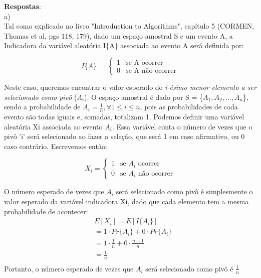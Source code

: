 \documentclass{article}
\begin{document}
\textbf{Respostas}:\\

a)\\
Tal como explicado no livro "Introduction to Algorithms", capítulo 5 (CORMEN, Thomas et al, pgs 118, 179), dado um espaço amostral S e um evento A, a Indicadora da variável aleatória I\{A\} associada ao evento A será definida por:

\[
 I\{A\}\ =
\left\{
\begin{array}{ll}
1& \textrm{se A ocorrer}\\
0& \textrm{se A não ocorrer}
\end{array}
\right.
\]

Neste caso, queremos encontrar o valor esperado do \textit{i-ésimo menor elemento a ser selecionado como pivô} ($A_{i}$). O espaço amostral é dado por S = \{$A_{1}, A_{2}, ..., A_{n}$\}, sendo a probabilidade de $A_{i} = \frac{1}{n}, \forall 1\leq i \leq  n$, pois as probabilidades de cada evento são todas iguais e, somadas, totalizam 1.
Podemos definir uma variável aleatória Xi associada ao evento $A_{i}$. Essa variável conta o número de vezes que o pivô 'i' será selecionado ao fazer a seleção, que será 1 em caso afirmativo, ou 0 caso contrário. Escrevemos então:

\[
X_{i} =
\left\{
\begin{array}{ll}
1& \textrm{se $A_{i}$ ocorrer}\\
0& \textrm{se $A_{i}$ não ocorrer}
\end{array}
\right.
\]

O número esperado de vezes que $A_{i}$ será selecionado como pivô é simplesmente o valor esperado da variável indicadora Xi, dado que cada elemento tem a mesma probabilidade de acontecer:	 \\
\begin{align*}
& E[X_{i}] = E[I\{A_{i}\}] \\
& = 1\cdot Pr\{A_{i}\} + 0\cdot Pr\{A_{i}\}  \\
& = 1\cdot\frac{1}{n} + 0\cdot\frac{n-1}{n} \\
& = \frac{1}{n}\\
\end{align*}
Portanto, o número esperado de vezes que $A_{i}$ será selecionado como pivô é $\frac{1}{n}$ \\
\end{document}
